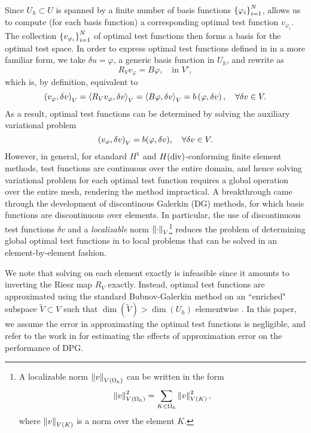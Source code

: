 Since $U_h \subset U$ is spanned by a finite number of basis functions $\LRc{\varphi_i}_{i=1}^N$,  allows us to compute (for each basis function) a corresponding optimal test function $v_{\varphi_i}$. The collection $\LRc{v_{\varphi_i}}_{i = 1}^N$ of optimal test functions then forms a basis for the optimal test space.  In order to express optimal test functions defined in  in a more familiar form, we take  $\delta u = \varphi$, a generic basis function in $U_h$, and rewrite  as
\[
R_Vv_{\varphi} = B\varphi, \quad \text{in } V',
\]
which is, by definition, equivalent to
\[
\LRp{v_\varphi,\delta v}_V = \LRa{R_Vv_\varphi,\delta v}_{V}=
\LRa{B\varphi, \delta v}_V = b\LRp{\varphi,\delta v}, \quad
\forall \delta v \in V.
\]
As a result, optimal test functions can be determined by solving the auxiliary
variational problem
\begin{equation}
\eqnlab{optvVar}
\left(v_\varphi,\delta v\right)_V = b(\varphi,\delta v), \quad \forall
\delta v \in V.
\end{equation}
However, in general, for standard $H^1$ and $H({\rm div})$-conforming finite element methods, test functions are continuous over the entire domain, and hence solving variational problem  for each optimal test function requires a global operation over the entire mesh, rendering the method impractical. A breakthrough came through the development of discontinous Galerkin (DG) methods, for which basis functions are discontinuous over elements. In particular, the use of discontinuous test functions $\delta v$ and a \textit{localizable} norm $\nor{\cdot}_V$\footnote{A localizable norm $\nor{v}_{V(\Oh)}$ can be written in the form 
$$\nor{v}_{V(\Oh)}^2 = \sum_{K\in\Oh} \nor{v}_{V(K)}^2,$$ where $\nor{v}_{V(K)}$ is a norm over the element $K$.} reduces the problem of determining global optimal test functions in  to local problems that can be solved in an element-by-element fashion.

We note that solving  on each element exactly is infeasible since it amounts to inverting the Riesz map $R_V$ exactly. Instead, optimal test functions are approximated using the standard Bubnov-Galerkin method on an ``enriched" subspace $\tilde{V} \subset V$ such that $\dim(\tilde{V}) > \dim(U_h)$ elementwise \cite{DPG1, DPG2}. In this paper, we assume the error in approximating the optimal test functions is negligible, and refer to the work in \cite{practicalDPG} for estimating the effects of approximation error on the performance of DPG.

